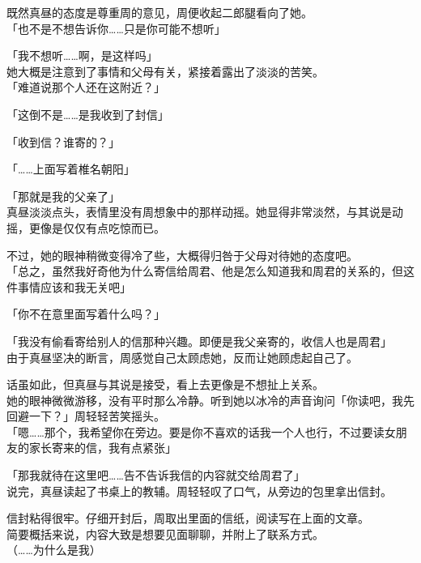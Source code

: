 既然真昼的态度是尊重周的意见，周便收起二郎腿看向了她。\\

「也不是不想告诉你……只是你可能不想听」

「我不想听……啊，是这样吗」\\

她大概是注意到了事情和父母有关，紧接着露出了淡淡的苦笑。\\

「难道说那个人还在这附近？」

「这倒不是……是我收到了封信」

「收到信？谁寄的？」

「……上面写着椎名朝阳」

「那就是我的父亲了」\\

真昼淡淡点头，表情里没有周想象中的那样动摇。她显得非常淡然，与其说是动摇，更像是仅仅有点吃惊而已。

不过，她的眼神稍微变得冷了些，大概得归咎于父母对待她的态度吧。\\

「总之，虽然我好奇他为什么寄信给周君、他是怎么知道我和周君的关系的，但这件事情应该和我无关吧」

「你不在意里面写着什么吗？」

「我没有偷看寄给别人的信那种兴趣。即便是我父亲寄的，收信人也是周君」\\

由于真昼坚决的断言，周感觉自己太顾虑她，反而让她顾虑起自己了。

话虽如此，但真昼与其说是接受，看上去更像是不想扯上关系。\\

她的眼神微微游移，没有平时那么冷静。听到她以冰冷的声音询问「你读吧，我先回避一下？」周轻轻苦笑摇头。\\

「嗯……那个，我希望你在旁边。要是你不喜欢的话我一个人也行，不过要读女朋友的家长寄来的信，我有点紧张」

「那我就待在这里吧……告不告诉我信的内容就交给周君了」\\

说完，真昼读起了书桌上的教辅。周轻轻叹了口气，从旁边的包里拿出信封。

信封粘得很牢。仔细开封后，周取出里面的信纸，阅读写在上面的文章。\\

简要概括来说，内容大致是想要见面聊聊，并附上了联系方式。\\

（……为什么是我）\\

